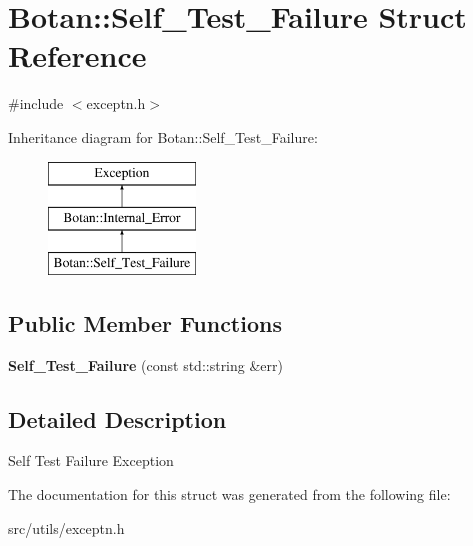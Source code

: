 \hypertarget{structBotan_1_1Self__Test__Failure}{\section{Botan\-:\-:Self\-\_\-\-Test\-\_\-\-Failure Struct Reference}
\label{structBotan_1_1Self__Test__Failure}
}


{\ttfamily \#include $<$exceptn.\-h$>$}

Inheritance diagram for Botan\-:\-:Self\-\_\-\-Test\-\_\-\-Failure\-:\begin{figure}[H]
\begin{center}
\leavevmode
\includegraphics[height=3.000000cm]{structBotan_1_1Self__Test__Failure}
\end{center}
\end{figure}
\subsection*{Public Member Functions}
\begin{DoxyCompactItemize}
\item 
\hypertarget{structBotan_1_1Self__Test__Failure_a1b415a9980c8d16d69e303ed4aeacfd3}{{\bfseries Self\-\_\-\-Test\-\_\-\-Failure} (const std\-::string \&err)}\label{structBotan_1_1Self__Test__Failure_a1b415a9980c8d16d69e303ed4aeacfd3}

\end{DoxyCompactItemize}


\subsection{Detailed Description}
Self Test Failure Exception 

The documentation for this struct was generated from the following file\-:\begin{DoxyCompactItemize}
\item 
src/utils/exceptn.\-h\end{DoxyCompactItemize}
